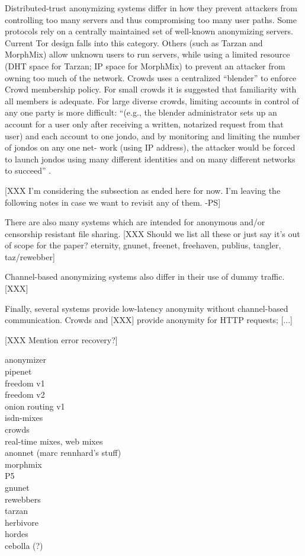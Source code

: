 \documentclass[times,10pt,twocolumn]{article}
\begin{document}
Distributed-trust anonymizing systems differ in how they prevent attackers
from controlling too many servers and thus compromising too many user paths.
Some protocols rely on a centrally maintained set of well-known anonymizing
servers.  Current Tor design falls into this category.
Others (such as Tarzan and MorphMix) allow unknown users to run
servers, while using a limited resource (DHT space for Tarzan; IP space for
MorphMix) to prevent an attacker from owning too much of the network.
Crowds uses a centralized ``blender'' to enforce Crowd membership
policy. For small crowds it is suggested that familiarity with all
members is adequate. For large diverse crowds, limiting accounts in
control of any one party is more difficult: 
``(e.g., the blender administrator sets up an account for a user only
after receiving a written, notarized request from that user) and each
account to one jondo, and by monitoring and limiting the number of
jondos on any one net- work (using IP address), the attacker would be
forced to launch jondos using many different identities and on many
different networks to succeed'' \cite{crowds-tissec}.


[XXX I'm considering the subsection as ended here for now. I'm leaving the
following notes in case we want to revisit any of them. -PS]

There are also many systems which are intended for anonymous
and/or censorship resistant file sharing. [XXX Should we list all these
or just say it's out of scope for the paper?
eternity, gnunet, freenet, freehaven, publius, tangler, taz/rewebber]



Channel-based anonymizing systems also differ in their use of dummy traffic.
[XXX]

Finally, several systems provide low-latency anonymity without channel-based
communication.  Crowds and [XXX] provide anonymity for HTTP requests; [...]

[XXX Mention error recovery?]



anonymizer\\
pipenet\\
freedom v1\\
freedom v2\\
onion routing v1\\
isdn-mixes\\
crowds\\
real-time mixes, web mixes\\
anonnet (marc rennhard's stuff)\\
morphmix\\
P5\\
gnunet\\
rewebbers\\
tarzan\\
herbivore\\
hordes\\
cebolla (?)\\
\end{document}
